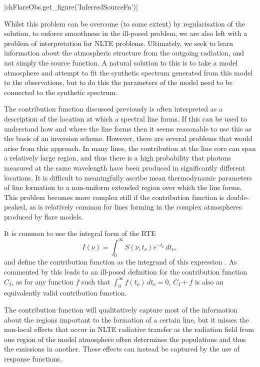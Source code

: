 \py[FlareObs]|chFlareObs.get_figure('InferredSourceFn')|

Whilst this problem can be overcome (to some extent) by regularisation of the solution, to enforce smoothness in the ill-posed problem, we are also left with a problem of interpretation for NLTE problems.
Ultimately, we seek to learn information about the atmospheric structure from the outgoing radiation, and not simply the source function.
A natural solution to this is to take a model atmosphere and attempt to fit the synthetic spectrum generated from this model to the observations, but to do this the parameters of the model need to be connected to the synthetic spectrum.

The contribution function discussed previously is often interpreted as a description of the location at which a spectral line forms.
If this can be used to understand how and where the line forms then it seems reasonable to use this as the basis of an inversion scheme.
However, there are several problems that would arise from this approach.
In many lines, the contribution at the line core can span a relatively large region, and thus there is a high probability that photons measured at the same wavelength have been produced in significantly different locations.
It is difficult to meaningfully ascribe mean thermodynamic parameters of line formation to a non-uniform extended region over which the line forms.
This problem becomes more complex still if the contribution function is double-peaked, as is relatively common for lines forming in the complex atmospheres produced by flare models.

It is common to use the integral form of the RTE
\begin{equation}
    I(\nu) = \int_0^\infty S(\nu, t_\nu) e^{-t_\nu}\, dt_\nu,
\end{equation}
and define the contribution function as the integrand of this expression \citep{Carlsson1997,DelToroIniesta2003}.
As commented by \citet{DelToroIniesta2003} this leads to an ill-posed definition for the contribution function $C_I$, as for any function $f$ such that $\int_0^\infty f(t_\nu)\, dt_\nu = 0$, $C_I + f$ is also an equivalently valid contribution function.

The contribution function will qualitatively capture most of the information about the regions important to the formation of a certain line, but it misses the non-local effects that occur in NLTE radiative transfer as the radiation field from one region of the model atmosphere often determines the populations and thus the emissions in another.
These effects can instead be captured by the use of response functions.

